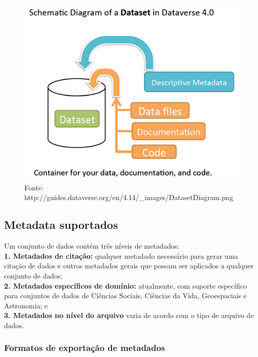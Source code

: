 \documentclass[12pt,hidelinks]{article}
\begin{document}
\begin{figure}[H]
                \centering
                \includegraphics[scale=0.5]{dtset.png}
                \caption{Fonte: http://guides.dataverse.org/en/4.14/\_images/DatasetDiagram.png}
            \label{Dataset}
        \end{figure}


    \subsection{Metadata suportados}
    
\qquad Um conjunto de dados contém três níveis de metadados:\\

\textbf{1. Metadados de citação:} qualquer metadado necessário para gerar uma citação de dados e outros metadados gerais que possam ser aplicados a qualquer conjunto de dados;\\

\textbf{2. Metadados específicos de domínio:} atualmente, com suporte específico para conjuntos de dados de Ciências Sociais, Ciências da Vida, Geoespaciais e Astronomia; e\\

\textbf{3. Metadados no nível do arquivo} varia de acordo com o tipo de arquivo de dados.

    
        \subsubsection{Formatos de exportação de metadados}
        
\end{document}
